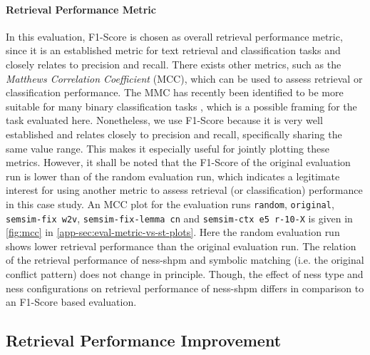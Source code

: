 \documentclass[11pt, numbers=noenddot]{scrreprt}
\let\cite\parencite  %
\begin{document}
\paragraph{Retrieval Performance Metric}
In this evaluation, F1-Score is chosen as overall retrieval performance metric, since it is an established metric for text retrieval and classification tasks and closely relates to precision and recall. There exists other metrics, such as the \textit{Matthews Correlation Coefficient} (MCC), which can be used to assess retrieval or classification performance. The MMC has recently been identified to be more suitable for many binary classification tasks \cite{chiccoAdvantagesMatthewsCorrelation2020}, which is a possible framing for the task evaluated here. Nonetheless, we use F1-Score because it is very well established and relates closely to precision and recall, specifically sharing the same value range. This makes it especially useful for jointly plotting these metrics. However, it shall be noted that the F1-Score of the original evaluation run is lower than of the random evaluation run, which indicates a legitimate interest for using another metric to assess retrieval (or classification) performance  in this case study. An MCC plot for the evaluation runs \texttt{random}, \texttt{original}, \texttt{semsim-fix w2v}, \texttt{semsim-fix-lemma cn} and \texttt{semsim-ctx e5 r-10-X} is given in \cref{fig:mcc} in \cref{app-sec:eval-metric-vs-st-plots}. Here the random evaluation run shows lower retrieval performance than the original evaluation run. The relation of the retrieval performance of \gls{ness-shpm} and symbolic matching (i.e. the original conflict pattern) does not change in principle. Though, the effect of \gls{ness} type and \gls{ness} configurations on retrieval performance of \gls{ness-shpm} differs in comparison to an F1-Score based evaluation.


\subsection{Retrieval Performance Improvement}
\label{sec:result-retrieval-performance-improvement}
\end{document}
